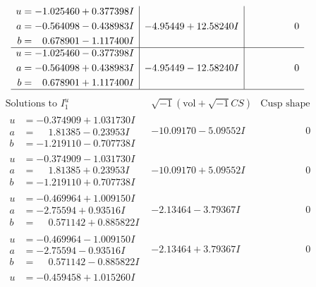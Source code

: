 \documentclass[1p]{elsarticle_modified}
\theoremstyle{definition}
\newcommand{\I}{\sqrt{-1}}
\begin{document}
$$\begin{array}{c|c|c}
\begin{aligned}
u &= -1.025460 + 0.377398 I \\
a &= -0.564098 - 0.438983 I \\
b &= \phantom{-}0.678901 - 1.117400 I\end{aligned}
 & -4.95449 + 12.58240 I & \phantom{-0.000000 } 0 \\ \hline\begin{aligned}
u &= -1.025460 - 0.377398 I \\
a &= -0.564098 + 0.438983 I \\
b &= \phantom{-}0.678901 + 1.117400 I\end{aligned}
 & -4.95449 - 12.58240 I & \phantom{-0.000000 } 0\\
 \hline 
 \end{array}$$\newpage$$\begin{array}{c|c|c}  
\text{Solutions to }I^u_{1}& \I (\text{vol} + \sqrt{-1}CS) & \text{Cusp shape}\\
 \hline 
\begin{aligned}
u &= -0.374909 + 1.031730 I \\
a &= \phantom{-}1.81385 - 0.23953 I \\
b &= -1.219110 - 0.707738 I\end{aligned}
 & -10.09170 - 5.09552 I & \phantom{-0.000000 } 0 \\ \hline\begin{aligned}
u &= -0.374909 - 1.031730 I \\
a &= \phantom{-}1.81385 + 0.23953 I \\
b &= -1.219110 + 0.707738 I\end{aligned}
 & -10.09170 + 5.09552 I & \phantom{-0.000000 } 0 \\ \hline\begin{aligned}
u &= -0.469964 + 1.009150 I \\
a &= -2.75594 + 0.93516 I \\
b &= \phantom{-}0.571142 + 0.885822 I\end{aligned}
 & -2.13464 - 3.79367 I & \phantom{-0.000000 } 0 \\ \hline\begin{aligned}
u &= -0.469964 - 1.009150 I \\
a &= -2.75594 - 0.93516 I \\
b &= \phantom{-}0.571142 - 0.885822 I\end{aligned}
 & -2.13464 + 3.79367 I & \phantom{-0.000000 } 0 \\ \hline\begin{aligned}
u &= -0.459458 + 1.015260 I \\

\end{aligned}
\end{array}$$
\end{document}
